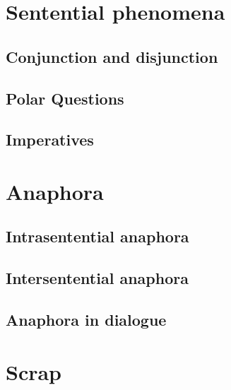 \section{Sentential phenomena}

\subsection{Conjunction and disjunction}

\subsection{Polar Questions}

\subsection{Imperatives}

\section{Anaphora}

\subsection{Intrasentential anaphora}

\subsection{Intersentential anaphora}

\subsection{Anaphora in dialogue}

\section*{Scrap}

